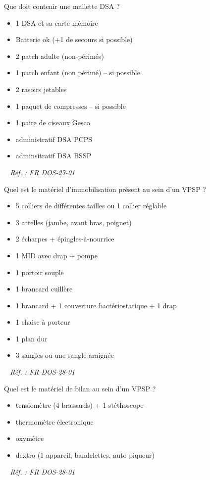 \documentclass[grid,avery5371,landscape]{flashcards}
\makeatletter
\newcounter{nocarte}
\newcommand{\categ}[1]{%
  \def\@categ{#1}%
  \setcounter{nocarte}{0}%
}
\newcommand{\source}[1]{%
  \medskip
  \itshape%
   ~ \hfill Réf. : #1}
\makeatother
\begin{document}
\color[HTML]{01DFA5}
\categ{TECH}
\begin{flashcard}[matériel]{
 Que doit contenir une mallette DSA ?   }
  \begin{itemize}
        \item 1 DSA et sa carte mémoire
        \item Batterie ok (+1 de secours si possible)
        \item 2 patch adulte (non-périmés)
        \item 1 patch enfant (non périmé) -- si possible
        \item 2 rasoirs jetables
        \item 1 paquet de compresses -- si possible
        \item 1 paire de ciseaux Gesco
        \item administratif DSA PCPS
        \item adminsitratif DSA BSSP
    \end{itemize}
  \source{FR DOS-27-01}
\end{flashcard}


\color[HTML]{01DFA5}
\categ{TECH}
\begin{flashcard}[matériel]{
 Quel est le matériel d'immobilisation présent au sein d'un VPSP ?   }
  \begin{itemize}
        \item 5 colliers de différentes tailles
ou 1 collier réglable
        \item 3 attelles (jambe, avant bras, poignet)
        \item 2 écharpes + épingles-à-nourrice
        \item 1 MID avec drap + pompe
        \item 1 portoir souple       
        \item 1 brancard cuillère
        \item 1 brancard + 1 couverture bactériostatique + 1
drap
        \item 1 chaise à porteur
        \item 1 plan dur
        \item 3 sangles ou une sangle araignée
    \end{itemize}
  \source{FR DOS-28-01}
\end{flashcard}


\color[HTML]{01DFA5}
\categ{TECH}
\begin{flashcard}[matériel]{
 Quel est le matériel de bilan au sein d'un VPSP ?   }
  \begin{itemize}
        \item tensiomètre (4 brassards) + 1 stéthoscope
        \item thermomètre électronique
        \item oxymètre
        \item dextro (1 appareil, bandelettes, auto-piqueur)
    \end{itemize}
  \source{FR DOS-28-01}
\end{flashcard}
\end{document}
